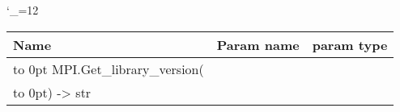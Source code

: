 \begingroup \catcode`\_=12 \tt
\begin{tabular}{lll}
\toprule
\textrm{Name}&\textrm{Param name}&\textrm{param type}\\
\midrule
\hbox to 0pt {MPI.Get_library_version(\hss}\\
\hbox to 0pt{) -> str\hss}\\
\bottomrule
\end{tabular}
\endgroup
